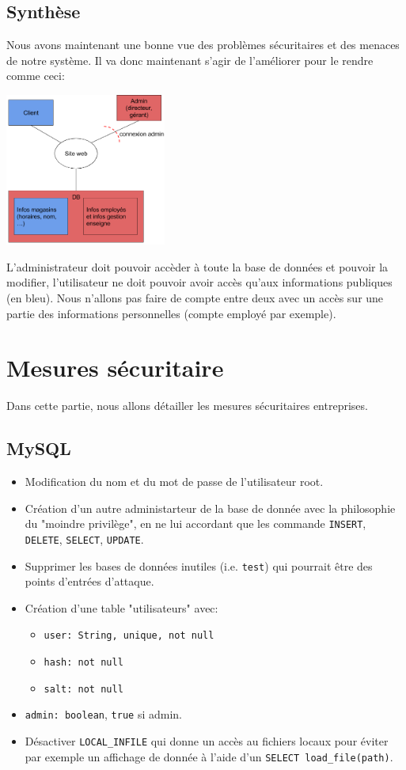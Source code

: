 \documentclass[a4paper]{article}
\begin{document}
\subsection{Synthèse}
Nous avons maintenant une bonne vue des problèmes sécuritaires et des menaces de notre système. Il va donc maintenant s'agir de l'améliorer pour le rendre comme ceci:\\
\begin{center}
 \includegraphics[width=200px]{img/systeme.png}
\end{center}

L'administrateur doit pouvoir accèder à toute la base de données et pouvoir la modifier, l'utilisateur ne doit pouvoir avoir accès qu'aux informations publiques (en bleu). Nous n'allons pas faire de compte entre deux avec un accès sur une partie des informations personnelles (compte employé par exemple).


\section{Mesures sécuritaire}
Dans cette partie, nous allons détailler les mesures sécuritaires entreprises.
\subsection{MySQL}
\begin{itemize}
\item Modification du nom et du mot de passe de l'utilisateur root.
\item Création d'un autre administarteur de la base de donnée avec la philosophie du "moindre privilège", en ne lui accordant que les commande \lstinline{INSERT}, \lstinline{DELETE}, \lstinline{SELECT}, \lstinline{UPDATE}.
\item Supprimer les bases de données inutiles (i.e. \texttt{test}) qui pourrait être des points d'entrées d'attaque.
\item Création d'une table "utilisateurs" avec:
	\begin{itemize}
	\item \texttt{user: String, unique, not null}
	\item \texttt{hash: not null}
	\item \texttt{salt: not null}
	\end{itemize}
    \item \texttt{admin: boolean}, \lstinline{true} si admin.
\item Désactiver \texttt{LOCAL\_INFILE} qui donne un accès au fichiers locaux pour éviter par exemple un affichage de donnée à l'aide d'un \lstinline{SELECT load_file(path)}.
\end{itemize}
\end{document}
